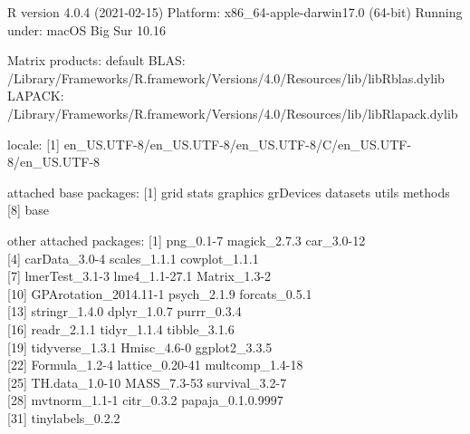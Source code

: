 \documentclass[
  english,
  man,floatsintext]{apa7}
\begin{document}
R version 4.0.4 (2021-02-15)
Platform: x86\_64-apple-darwin17.0 (64-bit)
Running under: macOS Big Sur 10.16

Matrix products: default
BLAS: /Library/Frameworks/R.framework/Versions/4.0/Resources/lib/libRblas.dylib
LAPACK: /Library/Frameworks/R.framework/Versions/4.0/Resources/lib/libRlapack.dylib

locale:
{[}1{]} en\_US.UTF-8/en\_US.UTF-8/en\_US.UTF-8/C/en\_US.UTF-8/en\_US.UTF-8

attached base packages:
{[}1{]} grid stats graphics grDevices datasets utils methods\\
{[}8{]} base

other attached packages:
{[}1{]} png\_0.1-7 magick\_2.7.3 car\_3.0-12\\
{[}4{]} carData\_3.0-4 scales\_1.1.1 cowplot\_1.1.1\\
{[}7{]} lmerTest\_3.1-3 lme4\_1.1-27.1 Matrix\_1.3-2\\
{[}10{]} GPArotation\_2014.11-1 psych\_2.1.9 forcats\_0.5.1\\
{[}13{]} stringr\_1.4.0 dplyr\_1.0.7 purrr\_0.3.4\\
{[}16{]} readr\_2.1.1 tidyr\_1.1.4 tibble\_3.1.6\\
{[}19{]} tidyverse\_1.3.1 Hmisc\_4.6-0 ggplot2\_3.3.5\\
{[}22{]} Formula\_1.2-4 lattice\_0.20-41 multcomp\_1.4-18\\
{[}25{]} TH.data\_1.0-10 MASS\_7.3-53 survival\_3.2-7\\
{[}28{]} mvtnorm\_1.1-1 citr\_0.3.2 papaja\_0.1.0.9997\\
{[}31{]} tinylabels\_0.2.2
\end{document}
